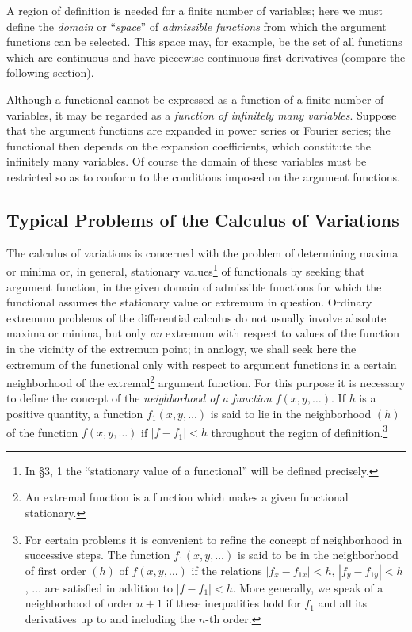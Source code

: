A region of definition is needed for a finite number of variables; here we must define the \emph{domain} or ``\emph{space}'' of \emph{admissible functions} from which the argument functions can be selected. This space may, for example, be the set of all functions which are continuous and have piecewise continuous first derivatives (compare the following section).

Although a functional cannot be expressed as a function of a finite number of variables, it may be regarded as a \emph{function of infinitely many variables}. Suppose that the argument functions are expanded in power series or Fourier series; the functional then depends on the expansion coefficients, which constitute the infinitely many variables. Of course the domain of these variables must be restricted so as to conform to the conditions imposed on the argument functions.

\subsection{Typical Problems of the Calculus of Variations}
The calculus of variations is concerned with the problem of determining maxima or minima or, in general, stationary values\footnote{In \S3, 1 the ``stationary value of a functional'' will be defined precisely.} of functionals by seeking that argument function, in the given domain of admissible functions for which the functional assumes the stationary value or extremum in question. Ordinary extremum problems of the differential calculus do not usually involve absolute maxima or minima, but only \emph{an} extremum with respect to values of the function in the vicinity of the extremum point; in analogy, we shall seek here the extremum of the functional only with respect to argument functions in a certain neighborhood of the extremal\footnote{An extremal function is a function which makes a given functional stationary.} argument function. For this purpose it is necessary to define the concept of the \emph{neighborhood of a function} $f(x,y,\ldots)$. If $h$ is a positive quantity, a function $f_1(x,y,\ldots)$ is said to lie in the neighborhood $(h)$ of the function $f(x,y,\ldots)$ if $|f-f_1|<h$ throughout the region of definition.\footnote{For certain problems it is convenient to refine the concept of neighborhood in successive steps. The function $f_1(x,y,\ldots)$ is said to be in the neighborhood of first order $(h)$ of $f(x,y,\ldots)$ if the relations $|f_x-f_{1x}|<h$, $|f_y-f_{1y}|<h$, $\ldots$ are satisfied in addition to $|f-f_1|<h$. More generally, we speak of a neighborhood of order $n+1$ if these inequalities hold for $f_1$ and all its derivatives up to and including the $n$-th order.}

